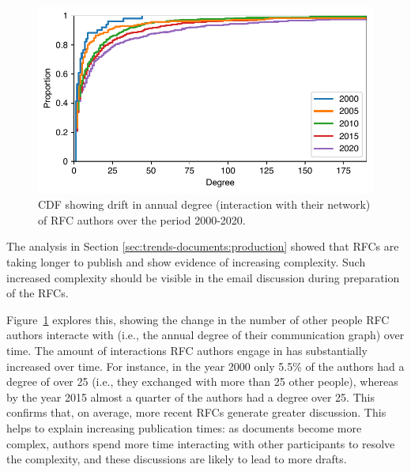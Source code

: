 \documentclass[twocolumn,10pt]{article}
\newlength{\figureWidthOneColumn}
\newcommand{\pb}[1]{\vspace{0.75ex}\noindent{\textbf{#1}}}
\begin{document}
\begin{figure}
  \centering
  \includegraphics[width=\figureWidthOneColumn]{figures-prev/imc-2021/emails/rfc_authors_degree.pdf}
  \caption{
    CDF showing drift in annual degree (interaction with their network)
    of RFC authors over the period 2000-2020.
  }
  \label{fig:degree_dist_rfc_authors}
\end{figure}

\pb{Evolution of interactions:}
The analysis in Section \ref{sec:trends-documents:production} showed that
RFCs are taking longer to publish and show evidence of increasing complexity.
Such increased complexity should be visible in the email discussion during
preparation of the RFCs.

Figure~\ref{fig:degree_dist_rfc_authors} explores this, showing the change
in the number of other people RFC authors interacte with (i.e., the annual
degree of their communication graph) over time. The amount of interactions
RFC authors engage in has substantially increased over time. For instance,
in the year 2000 only 5.5\% of the authors had a degree of over 25 (i.e.,
they exchanged with more than 25 other people), whereas by the year 2015
almost a quarter of the authors had a degree over 25. This confirms that,
on average, more recent RFCs generate greater discussion. This helps to
explain increasing publication times: as documents become more complex,
authors spend more time interacting with other participants to resolve
the complexity, and these discussions are likely to lead to more drafts.
\end{document}
